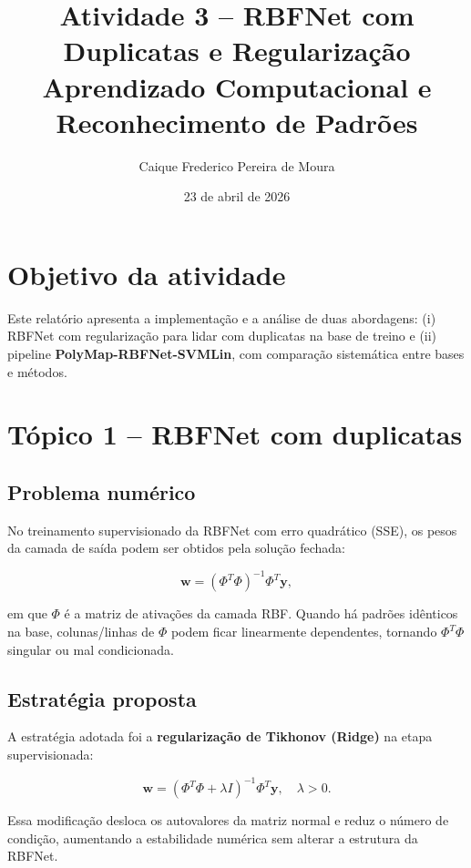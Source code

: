 \documentclass[11pt,a4paper]{article}
\title{\textbf{Atividade 3 -- RBFNet com Duplicatas e Regularização}\\[1.2em]\large Aprendizado Computacional e Reconhecimento de Padrões}
\author{Caique Frederico Pereira de Moura}
\date{23 de abril de 2026}
\begin{document}
\maketitle
\tableofcontents
\newpage

\section{Objetivo da atividade}

Este relatório apresenta a implementação e a análise de duas abordagens: (i) RBFNet com regularização para lidar com duplicatas na base de treino e (ii) pipeline \textbf{PolyMap-RBFNet-SVMLin}, com comparação sistemática entre bases e métodos.

\section{Tópico 1 -- RBFNet com duplicatas}

\subsection{Problema numérico}

No treinamento supervisionado da RBFNet com erro quadrático (SSE), os pesos da camada de saída podem ser obtidos pela solução fechada:

\begin{equation}
\mathbf{w} = (\Phi^T\Phi)^{-1}\Phi^T\mathbf{y},
\end{equation}

em que $\Phi$ é a matriz de ativações da camada RBF. Quando há padrões idênticos na base, colunas/linhas de $\Phi$ podem ficar linearmente dependentes, tornando $\Phi^T\Phi$ singular ou mal condicionada.

\subsection{Estratégia proposta}

A estratégia adotada foi a \textbf{regularização de Tikhonov (Ridge)} na etapa supervisionada:

\begin{equation}
\mathbf{w} = (\Phi^T\Phi + \lambda I)^{-1}\Phi^T\mathbf{y}, \quad \lambda > 0.
\end{equation}

Essa modificação desloca os autovalores da matriz normal e reduz o número de condição, aumentando a estabilidade numérica sem alterar a estrutura da RBFNet.
\end{document}
